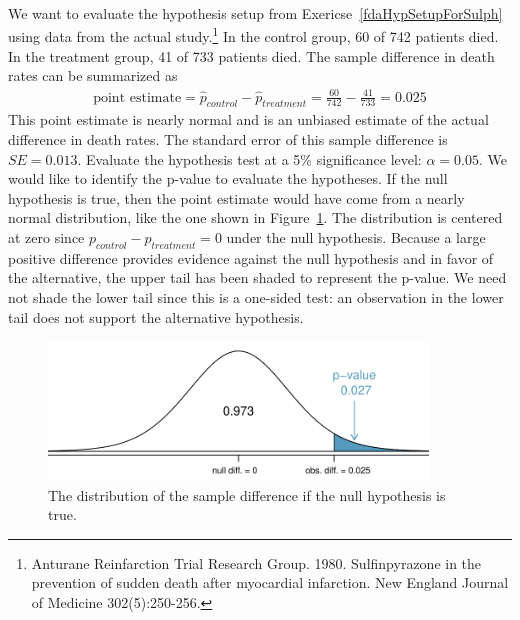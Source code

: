 \begin{example}{We want to evaluate the hypothesis setup from Exericse~\ref{fdaHypSetupForSulph} using data from the actual study.\footnote{Anturane Reinfarction Trial Research Group. 1980. Sulfinpyrazone in the prevention of sudden death after myocardial infarction. New England Journal of Medicine 302(5):250-256.} In the control group, 60 of 742 patients died. In the treatment group, 41 of 733 patients died. The sample difference in death rates can be summarized as
\begin{eqnarray*}
\text{point estimate} = \hat{p}_{control} - \hat{p}_{treatment} = \frac{60}{742} - \frac{41}{733} = 0.025
\end{eqnarray*}
This point estimate is nearly normal and is an unbiased estimate of the actual difference in death rates. The standard error of this sample difference is $SE = 0.013$. Evaluate the hypothesis test at a 5\% significance level: $\alpha=0.05$.}
We would like to identify the p-value to evaluate the hypotheses. If the null hypothesis is true, then the point estimate would have come from a nearly normal distribution, like the one shown in Figure~\ref{sulphStudyFindPValueUsingNormalApprox}. The distribution is centered at zero since $p_{control}-p_{treatment}=0$ under the null hypothesis. Because a large positive difference provides evidence against the null hypothesis and in favor of the alternative, the upper tail has been shaded to represent the p-value. We need not shade the lower tail since this is a one-sided test: an observation in the lower tail does not support the alternative hypothesis.

\begin{figure}[bt]
   \centering
   \includegraphics[height=37mm]{04/figures/sulphStudyFindPValueUsingNormalApprox/sulphStudyFindPValueUsingNormalApprox}
   \caption{The distribution of the sample difference if the null hypothesis is true.}
   \label{sulphStudyFindPValueUsingNormalApprox}
\end{figure}


\end{example}

